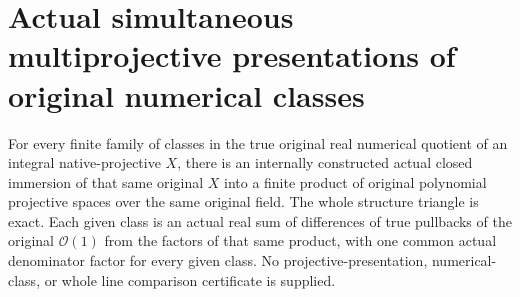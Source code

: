 \section{Actual simultaneous multiprojective presentations of original numerical classes}
\label{sec:native-numerical-projective-presentations}

\begin{theorem}
\label{thm:native-numerical-projective-presentations}
\leanok
{}
For every finite family of classes in the true original real
numerical quotient of an integral native-projective $X$, there
is an internally constructed actual closed immersion of that
same original $X$ into a finite product of original polynomial
projective spaces over the same original field. The whole
structure triangle is exact. Each given class is an actual real
sum of differences of true pullbacks of the original
$\mathcal O(1)$ from the factors of that same product, with one
common actual denominator factor for every given class. No
projective-presentation, numerical-class, or whole line comparison
certificate is supplied.
\end{theorem}

